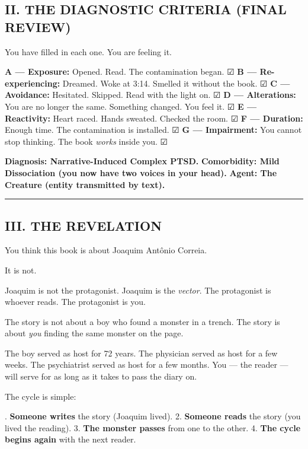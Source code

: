 \subsection*{II. THE DIAGNOSTIC CRITERIA (FINAL REVIEW)}

\noindent You have filled in each one. You are feeling it.

\noindent \textbf{A --- Exposure:} Opened. Read. The contamination began. ☑
\textbf{B --- Re-experiencing:} Dreamed. Woke at 3:14. Smelled it without the book. ☑
\textbf{C --- Avoidance:} Hesitated. Skipped. Read with the light on. ☑
\textbf{D --- Alterations:} You are no longer the same. Something changed. You feel it. ☑
\textbf{E --- Reactivity:} Heart raced. Hands sweated. Checked the room. ☑
\textbf{F --- Duration:} Enough time. The contamination is installed. ☑
\textbf{G --- Impairment:} You cannot stop thinking. The book \textit{works} inside you. ☑

\noindent \textbf{Diagnosis: Narrative-Induced Complex PTSD.}
\textbf{Comorbidity: Mild Dissociation (you now have two voices in your head).}
\textbf{Agent: The Creature (entity transmitted by text).}

\vspace{0.5em}\noindent\rule{\textwidth}{0.5pt}\vspace{0.5em}

\subsection*{III. THE REVELATION}

\noindent You think this book is about Joaquim Antônio Correia.

\noindent It is not.

\noindent Joaquim is not the protagonist.
Joaquim is the \textit{vector}.
The protagonist is whoever reads.
The protagonist is you.

\noindent The story is not about a boy who found a monster in a trench.
The story is about \textit{you} finding the same monster on the page.

\noindent The boy served as host for 72 years.
The physician served as host for a few weeks.
The psychiatrist served as host for a few months.
You --- the reader --- will serve for as long as it takes to pass the diary on.

\noindent The cycle is simple:

. \textbf{Someone writes} the story (Joaquim lived).
2. \textbf{Someone reads} the story (you lived the reading).
3. \textbf{The monster passes} from one to the other.
4. \textbf{The cycle begins again} with the next reader.

